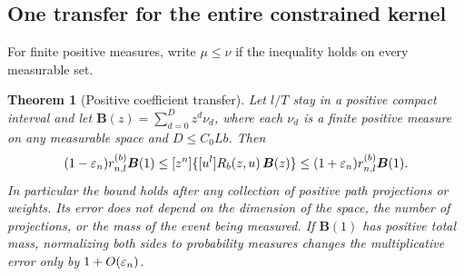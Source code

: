 \documentclass[11pt]{article}
\newtheorem{theorem}{Theorem}[section]
\theoremstyle{definition}\newtheorem{definition}[theorem]{Definition}
\theoremstyle{remark}\newtheorem{remark}[theorem]{Remark}
\numberwithin{equation}{section}\allowdisplaybreaks
\begin{document}
\subsection{One transfer for the entire constrained kernel}
For finite positive measures, write $\mu\le\nu$ if the inequality holds
on every measurable set.
\begin{theorem}[Positive coefficient transfer]\label{thm:positive-transfer}
Let $l/T$ stay in a positive compact interval and let
$\boldsymbol B(z)=\sum_{d=0}^{D}z^d\nu_d$, where each $\nu_d$ is a
finite positive measure on any measurable space and $D\le C_0Lb$.
Then
\begin{equation}\label{eq:order-transfer}
 (1-\varepsilon_n)r_{n,l}^{(b)}\boldsymbol B(1)
 \le [z^n]\{[u^l]R_b(z,u)\,\boldsymbol B(z)\}
 \le(1+\varepsilon_n)r_{n,l}^{(b)}\boldsymbol B(1).
\end{equation}
In particular the bound holds after any collection of positive path
projections or weights. Its error does not depend on the dimension of
the space, the number of projections, or the mass of the event being
measured. If $\boldsymbol B(1)$ has positive total mass, normalizing
both sides to probability measures changes the multiplicative error only
by $1+O(\varepsilon_n)$.
\end{theorem}
\end{document}
